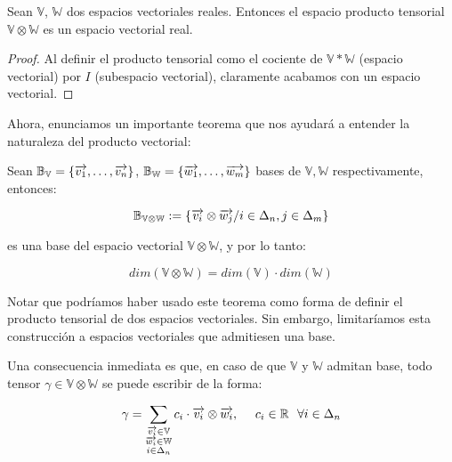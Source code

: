 \begin{proposicion}
    Sean $\mathbb{V}$, $\mathbb{W}$ dos espacios vectoriales reales. Entonces el espacio producto tensorial $\mathbb{V} \otimes \mathbb{W}$ es un espacio vectorial real.
\end{proposicion}

\begin{proof}
    Al definir el producto tensorial como el cociente de $\mathbb{V} \ast \mathbb{W}$ (espacio vectorial) por $I$ (subespacio vectorial), claramente acabamos con un espacio vectorial.
\end{proof}


Ahora, enunciamos un importante teorema que nos ayudará a entender la naturaleza del producto vectorial:

\begin{teorema} \label{th:base_prod_tensorial}
    Sean $\mathbb{B}_{\mathbb{V}} = \{\overrightarrow{v_1}, \ldots, \overrightarrow{v_n}\}$, $\mathbb{B}_{\mathbb{W}} = \{\overrightarrow{w_1}, \ldots, \overrightarrow{w_m}\}$ bases de $\mathbb{V}, \mathbb{W}$ respectivamente, entonces:

    $$\mathbb{B}_{\mathbb{V} \otimes \mathbb{W}} := \{\overrightarrow{v_i} \otimes \overrightarrow{w_j} / i \in \Delta_{n}, j \in \Delta_{m}\}$$

    es una base del espacio vectorial $\mathbb{V} \otimes \mathbb{W}$, y por lo tanto:

    $$dim(\mathbb{V} \otimes \mathbb{W}) = dim(\mathbb{V}) \cdot dim(\mathbb{W})$$
\end{teorema}

\begin{observacion}
    Notar que podríamos haber usado este teorema como forma de definir el producto tensorial de dos espacios vectoriales. Sin embargo, limitaríamos esta construcción a espacios vectoriales que admitiesen una base.
\end{observacion}

Una consecuencia inmediata es que, en caso de que $\mathbb{V}$ y $\mathbb{W}$ admitan base, todo tensor $\gamma \in \mathbb{V} \otimes \mathbb{W}$ se puede escribir de la forma:

\begin{equation}
    \gamma = \sum_{\substack{\overrightarrow{v_i} \in \mathbb{V}\\ \overrightarrow{w_i} \in \mathbb{W}\\ i \in \Delta_{n}}} c_{i} \cdot \overrightarrow{v_i} \otimes \overrightarrow{w_i}, \ \ \ \  c_i \in \mathbb{R} \ \  \forall i \in \Delta_{n}
\end{equation}

